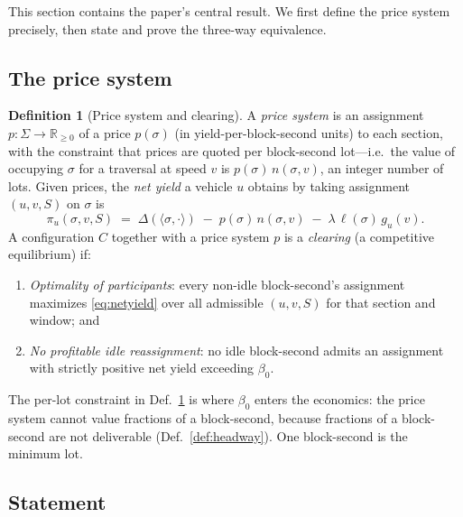 \documentclass[11pt,twocolumn,a4paper]{article}
\theoremstyle{definition}
\newtheorem{definition}[theorem]{Definition}
\theoremstyle{remark}
\newcommand{\Rnn}{\mathbb{R}_{\geq 0}}
\newcommand{\blocktime}{\beta_0}
\newcommand{\sections}{\Sigma}
\begin{document}
This section contains the paper's central result. We first define the price system precisely, then state and prove the three-way equivalence.

\subsection{The price system}

\begin{definition}[Price system and clearing]
\label{def:price_system}
A \emph{price system} is an assignment $p:\sections\to\Rnn$ of a price $p(\sigma)$ (in yield-per-block-second units) to each section, with the constraint that prices are quoted per block-second lot---i.e.\ the value of occupying $\sigma$ for a traversal at speed $v$ is $p(\sigma)\,n(\sigma,v)$, an integer number of lots. Given prices, the \emph{net yield} a vehicle $u$ obtains by taking assignment $(u,v,S)$ on $\sigma$ is
\begin{equation}
\label{eq:netyield}
\pi_u(\sigma,v,S) \;=\; \Delta(\langle\sigma,\cdot\rangle) \;-\; p(\sigma)\,n(\sigma,v) \;-\; \lambda\,\ell(\sigma)\,g_u(v).
\end{equation}
A configuration $C$ together with a price system $p$ is a \emph{clearing} (a competitive equilibrium) if:
\begin{enumerate}[nosep]
\item \emph{Optimality of participants}: every non-idle block-second's assignment maximizes \eqref{eq:netyield} over all admissible $(u,v,S)$ for that section and window; and
\item \emph{No profitable idle reassignment}: no idle block-second admits an assignment with strictly positive net yield exceeding $\blocktime$.
\end{enumerate}
\end{definition}

The per-lot constraint in Def.~\ref{def:price_system} is where $\blocktime$ enters the economics: the price system cannot value fractions of a block-second, because fractions of a block-second are not deliverable (Def.~\ref{def:headway}). One block-second is the minimum lot.

\subsection{Statement}
\end{document}
